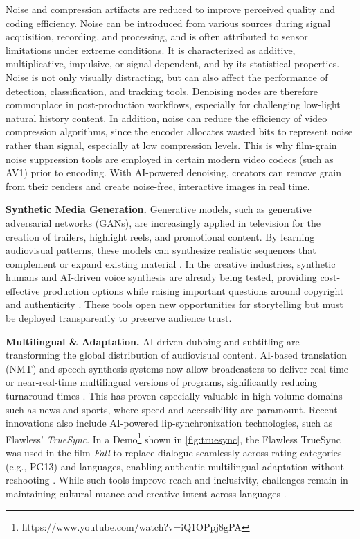 \documentclass[sigconf,authorversion,review,authordraft]{webmedia}
\begin{document}
Noise and compression artifacts are reduced to improve perceived quality and coding efficiency. Noise can be introduced from various sources during signal acquisition, recording, and processing, and is often attributed to sensor limitations under extreme conditions. It is characterized as additive, multiplicative, impulsive, or signal-dependent, and by its statistical properties. Noise is not only visually distracting, but can also affect the performance of detection, classification, and tracking tools. Denoising nodes are therefore commonplace in post-production workflows, especially for challenging low-light natural history content\cite{anantrasirichai2020encoding}. In addition, noise can reduce the efficiency of video compression algorithms, since the encoder allocates wasted bits to represent noise rather than signal, especially at low compression levels. This is why film-grain noise suppression tools are employed in certain modern video codecs (such as AV1) prior to encoding. With AI-powered denoising, creators can remove grain from their renders and create noise-free, interactive images in real time.

\textbf{Synthetic Media Generation.}
Generative models, such as generative adversarial networks (GANs), are increasingly applied in television for the creation of trailers, highlight reels, and promotional content. By learning audiovisual patterns, these models can synthesize realistic sequences that complement or expand existing material \cite{amato2019ai}. In the creative industries, synthetic humans and AI-driven voice synthesis are already being tested, providing cost-effective production options while raising important questions around copyright and authenticity \cite{anantrasirichai2022artificial}. These tools open new opportunities for storytelling but must be deployed transparently to preserve audience trust.

\textbf{Multilingual \& Adaptation.}
AI-driven dubbing and subtitling are transforming the global distribution of audiovisual content. AI-based translation (NMT) and speech synthesis systems now allow broadcasters to deliver real-time or near-real-time multilingual versions of programs, significantly reducing turnaround times \cite{journalmedia3010002}. This has proven especially valuable in high-volume domains such as news and sports, where speed and accessibility are paramount. Recent innovations also include AI-powered lip-synchronization technologies, such as Flawless' \emph{TrueSync}. In a Demo\footnote{https://www.youtube.com/watch?v=iQ1OPpj8gPA} shown in \autoref{fig:truesync}, the Flawless TrueSync was used in the film \emph{Fall} to replace dialogue seamlessly across rating categories (e.g., PG13) and languages, enabling authentic multilingual adaptation without reshooting \cite{granados2024ai}. While such tools improve reach and inclusivity, challenges remain in maintaining cultural nuance and creative intent across languages \cite{kaneko2020ai}.
\end{document}

